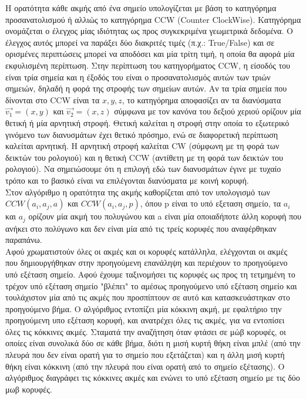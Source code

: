 \documentclass[12pt]{article}
\begin{document}
Η ορατότητα κάθε ακμής από ένα σημείο υπολογίζεται με βάση το κατηγόρημα προσανατολισμού ή αλλιώς το κατηγόρημα CCW (Counter ClockWise). Κατηγόρημα ονομάζεται ο έλεγχος μίας ιδιότητας ως προς συγκεκριμένα γεωμετρικά δεδομένα. Ο έλεγχος αυτός μπορεί να παράξει δύο διακριτές τιμές (π.χ.: True/False) και σε ορισμένες περιπτώσεις μπορεί να αποδόσει και μία τρίτη τιμή, η οποία θα αφορά μία εκφυλισμένη περίπτωση. Στην περίπτωση του κατηγορήματος CCW, η είσοδός του είναι τρία σημεία και η έξοδός του είναι ο προσανατολισμός αυτών των τριών σημειών, δηλαδή η φορά της στροφής των σημείων αυτών. Αν τα τρία σημεία που δίνονται στο CCW είναι τα \(x,y,z\), το κατηγόρημα αποφασίζει αν τα διανύσματα \(\vec{v_1} = (x,y)\) και \(\vec{v_2} = (x,z)\) σύμφωνα με τον κανόνα του δεξιού χεριού ορίζουν μία θετική ή μία αρνητική στροφή. Θετική καλείται η στροφή στην οποία το εξωτερικό γινόμενο των διανυσμάτων έχει θετικό πρόσημο, ενώ σε διαφορετική περίπτωση καλείται αρνητική. Η αρνητική στροφή καλείται CW (σύμφωνη με τη φορά των δεικτών του ρολογιού) και η θετική CCW (αντίθετη με τη φορά των δεικτών του ρολογιού). Να σημειώσουμε ότι η επιλογή εδώ των διανυσμάτων έγινε με τυχαίο τρόπο και το βασικό είναι να επιλέγονται διανύσματα με κοινή κορυφή. \\

Στον αλγόριθμο η ορατότητα της ακμής καθορίζεται από τον υπολογισμό των \(CCW(a_i, a_j, a)\) και \(CCW(a_i, a_j, p)\), όπου p είναι το υπό εξεταση σημείο, τα \(a_i\) και \(a_j\) ορίζουν μία ακμή του πολυγώνου και a είναι μία οποιαδήποτε άλλη κορυφή που ανήκει στο πολύγωνο και δεν είναι μία από τις τρείς κορυφές που αναφέρθηκαν παραπάνω. \\

Αφού χρωματιστούν όλες οι ακμές και οι κορυφές κατάλληλα, ελέγχονται οι ακμές που δημιουργήθηκαν στην προηγούμενη επανάληψη και περιέχουν το προηγούμενο υπό εξέταση σημείο. Αφού έχουμε ταξινομήσει τις κορυφές ως προς τη τετμημένη το τρέχον υπό εξέταση σημείο "βλέπει" το αμέσως προηγούμενο υπό εξέταση σημείο και τουλάχιστον μία από τις ακμές που προσπίπτουν σε αυτό και κατασκευάστηκαν στο προηγούμενο βήμα. Ο αλγόριθμος εντοπίζει μία κόκκινη ακμή, με εφαλτήριο την προηγούμενη υπο εξέταση κορυφή, και ανατρέχει όλες τις ακμές, για να εντοπίσει όλες τις κόκκινες ακμές. Σταματά την αναζήτηση όταν φτάσει σε μώβ κορυφές, οι οποίες είναι συνολικά δύο σε κάθε βήμα, διότι η μισή κυρτή θήκη είναι μπλέ (από την πλευρά που δεν είναι ορατή για το σημείο που εξετάζεται) και η άλλη μισή κυρτή θήκη είναι κόκκινη (από την πλευρά που είναι ορατή από το σημείο εξέτασης). Ο αλγόριθμος διαγράφει τις κόκκινες ακμές και ενώνει το υπό εξέταση σημείο με τις δύο μωβ κορυφές. \\
\end{document}
